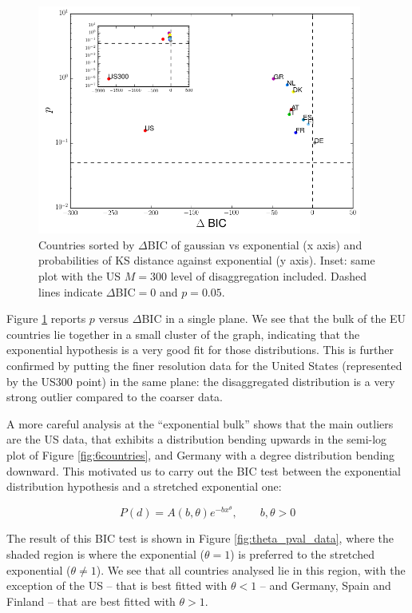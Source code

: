\begin{figure}[!ht]
  \centering
  \includegraphics[width=0.95\textwidth]{figs_io/bic_pval_countries.png}
  \caption{Countries sorted by $\Delta$BIC of gaussian vs exponential
    (x axis) and probabilities of KS distance against exponential (y
    axis). Inset: same plot with the US $M=300$ level of
    disaggregation included. Dashed lines indicate $\Delta$BIC$=0$ and
    $p=0.05$.}
  \label{fig:BICpval}
\end{figure}

Figure \ref{fig:BICpval} reports $p$ versus $\Delta$BIC in a single
plane. We see that the bulk of the EU countries lie together in a
small cluster of the graph, indicating that the exponential hypothesis
is a very good fit for those distributions. This is further confirmed
by putting the finer resolution data for the United States
(represented by the US300 point) in the same plane: the disaggregated
distribution is a very strong outlier compared to the coarser data.

A more careful analysis at the ``exponential bulk'' shows that the
main outliers are the US data, that exhibits a distribution bending
upwards in the semi-log plot of Figure \ref{fig:6countries}, and
Germany with a degree distribution bending downward. This motivated us
to carry out the BIC test between the exponential distribution
hypothesis and a stretched exponential one:

\begin{equation}
\label{eq:stretched_exp}
P(d)=A(b,\theta)e^{-b x^\theta},\qquad b,\theta>0
\end{equation}

The result of this BIC test is shown in Figure
\ref{fig:theta_pval_data}, where the shaded region is where the
exponential ($\theta = 1$) is preferred to the stretched exponential
($\theta \neq 1$). We see that all countries analysed lie in this
region, with the exception of the US -- that is best fitted with $\theta<1$ -- and
Germany, Spain and Finland -- that are best fitted with $\theta>1$.

